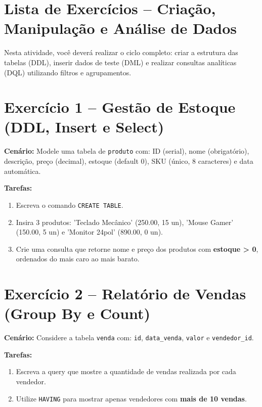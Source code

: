 \documentclass[12pt]{article}
\begin{document}
\section*{Lista de Exercícios – Criação, Manipulação e Análise de Dados}

\begin{tcolorbox}[colback=blue!5,colframe=blue!40!black,title=Objetivo da Atividade]
Nesta atividade, você deverá realizar o ciclo completo: criar a estrutura das tabelas (DDL), inserir dados de teste (DML) e realizar consultas analíticas (DQL) utilizando filtros e agrupamentos.
\end{tcolorbox}

\hrulefill

\section*{Exercício 1 – Gestão de Estoque (DDL, Insert e Select)}



\textbf{Cenário:} Modele uma tabela de \texttt{produto} com: ID (serial), nome (obrigatório), descrição, preço (decimal), estoque (default 0), SKU (único, 8 caracteres) e data automática.

\textbf{Tarefas:}
\begin{enumerate}
    \item Escreva o comando \texttt{CREATE TABLE}.
    \item Insira 3 produtos: 'Teclado Mecânico' (250.00, 15 un), 'Mouse Gamer' (150.00, 5 un) e 'Monitor 24pol' (890.00, 0 un).
    \item Crie uma consulta que retorne nome e preço dos produtos com \textbf{estoque > 0}, ordenados do mais caro ao mais barato.
\end{enumerate}

\hrulefill

\section*{Exercício 2 – Relatório de Vendas (Group By e Count)}



\textbf{Cenário:} Considere a tabela \texttt{venda} com: \texttt{id}, \texttt{data\_venda}, \texttt{valor} e \texttt{vendedor\_id}.

\textbf{Tarefas:}
\begin{enumerate}
    \item Escreva a query que mostre a quantidade de vendas realizada por cada vendedor.
    \item Utilize \texttt{HAVING} para mostrar apenas vendedores com \textbf{mais de 10 vendas}.
\end{enumerate}
\end{document}

